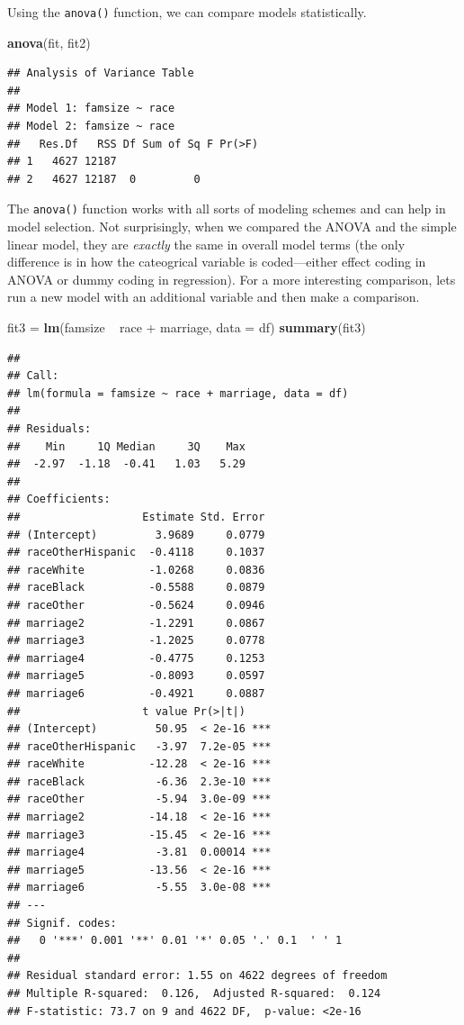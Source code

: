 \documentclass[]{tufte-book}
\newenvironment{Shaded}{}{}
\newcommand{\KeywordTok}[1]{\textcolor[rgb]{0.00,0.44,0.13}{\textbf{#1}}}
\newcommand{\DataTypeTok}[1]{\textcolor[rgb]{0.56,0.13,0.00}{#1}}
\newcommand{\StringTok}[1]{\textcolor[rgb]{0.25,0.44,0.63}{#1}}
\newcommand{\OperatorTok}[1]{\textcolor[rgb]{0.40,0.40,0.40}{#1}}
\newcommand{\NormalTok}[1]{#1}
\theoremstyle{definition}
\theoremstyle{definition}
\theoremstyle{remark}
\begin{document}
Using the \texttt{anova()} function, we can compare models
statistically.

\begin{Shaded}
\begin{Highlighting}[]
\KeywordTok{anova}\NormalTok{(fit, fit2)}
\end{Highlighting}
\end{Shaded}

\begin{verbatim}
## Analysis of Variance Table
## 
## Model 1: famsize ~ race
## Model 2: famsize ~ race
##   Res.Df   RSS Df Sum of Sq F Pr(>F)
## 1   4627 12187                      
## 2   4627 12187  0         0
\end{verbatim}

The \texttt{anova()} function works with all sorts of modeling schemes
and can help in model selection. Not surprisingly, when we compared the
ANOVA and the simple linear model, they are \emph{exactly} the same in
overall model terms (the only difference is in how the cateogrical
variable is coded---either effect coding in ANOVA or dummy coding in
regression). For a more interesting comparison, lets run a new model
with an additional variable and then make a comparison.

\begin{Shaded}
\begin{Highlighting}[]
\NormalTok{fit3 =}\StringTok{ }\KeywordTok{lm}\NormalTok{(famsize }\OperatorTok{~}\StringTok{ }\NormalTok{race }\OperatorTok{+}\StringTok{ }\NormalTok{marriage, }\DataTypeTok{data =}\NormalTok{ df)}
\KeywordTok{summary}\NormalTok{(fit3)}
\end{Highlighting}
\end{Shaded}

\begin{verbatim}
## 
## Call:
## lm(formula = famsize ~ race + marriage, data = df)
## 
## Residuals:
##    Min     1Q Median     3Q    Max 
##  -2.97  -1.18  -0.41   1.03   5.29 
## 
## Coefficients:
##                   Estimate Std. Error
## (Intercept)         3.9689     0.0779
## raceOtherHispanic  -0.4118     0.1037
## raceWhite          -1.0268     0.0836
## raceBlack          -0.5588     0.0879
## raceOther          -0.5624     0.0946
## marriage2          -1.2291     0.0867
## marriage3          -1.2025     0.0778
## marriage4          -0.4775     0.1253
## marriage5          -0.8093     0.0597
## marriage6          -0.4921     0.0887
##                   t value Pr(>|t|)    
## (Intercept)         50.95  < 2e-16 ***
## raceOtherHispanic   -3.97  7.2e-05 ***
## raceWhite          -12.28  < 2e-16 ***
## raceBlack           -6.36  2.3e-10 ***
## raceOther           -5.94  3.0e-09 ***
## marriage2          -14.18  < 2e-16 ***
## marriage3          -15.45  < 2e-16 ***
## marriage4           -3.81  0.00014 ***
## marriage5          -13.56  < 2e-16 ***
## marriage6           -5.55  3.0e-08 ***
## ---
## Signif. codes:  
##   0 '***' 0.001 '**' 0.01 '*' 0.05 '.' 0.1  ' ' 1
## 
## Residual standard error: 1.55 on 4622 degrees of freedom
## Multiple R-squared:  0.126,  Adjusted R-squared:  0.124 
## F-statistic: 73.7 on 9 and 4622 DF,  p-value: <2e-16
\end{verbatim}
\end{document}
